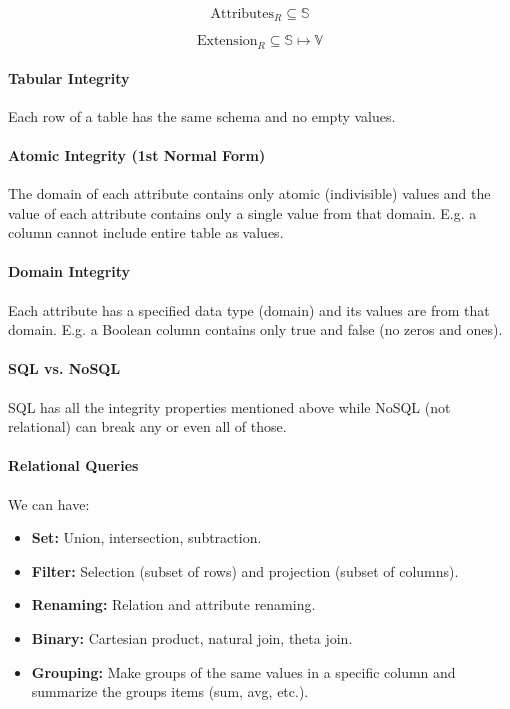 $$
\text{Attributes}_R \subseteq \mathbb{S}
$$

$$
\text{Extension}_R \subseteq \mathbb{S} \mapsto \mathbb{V}
$$

\paragraph{Tabular Integrity}
Each row of a table has the same schema and no empty values.

\paragraph{Atomic Integrity (1st Normal Form)}
The domain of each attribute contains only atomic (indivisible) values and the value of each attribute contains only a single value from that domain. E.g. a column cannot include entire table as values.

\paragraph{Domain Integrity}
Each attribute has a specified data type (domain) and its values are from that domain. E.g. a Boolean column contains only true and false (no zeros and ones).

\paragraph{SQL vs. NoSQL}
SQL has all the integrity properties mentioned above while NoSQL (not relational) can break any or even all of those.

\paragraph{Relational Queries}
We can have:
\begin{itemize}
    \item \textbf{Set:} Union, intersection, subtraction.
    \item \textbf{Filter:} Selection (subset of rows) and projection (subset of columns).
    \item \textbf{Renaming:} Relation and attribute renaming.
    \item \textbf{Binary:} Cartesian product, natural join, theta join.
    \item \textbf{Grouping:} Make groups of the same values in a specific column and summarize the groups items (sum, avg, etc.).
\end{itemize}


